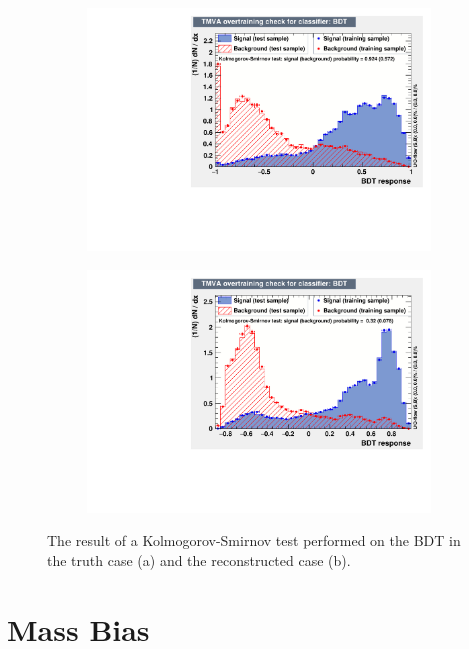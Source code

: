 \documentclass[10pt,a4paper]{book}
\begin{document}
\begin{figure}[h]
\begin{subfigure}{1.0\textwidth}
\centering
\includegraphics[scale=0.7]{ch4_images/BDT_overtraining_truth}
\caption{}
\end{subfigure}
\begin{subfigure}{1.0\textwidth}
\centering
\includegraphics[scale=0.7]{ch4_images/BDT_overtraining_reco}
\caption{}
\end{subfigure}
\caption{The result of a Kolmogorov-Smirnov test performed on the BDT in the truth case (a) and the reconstructed case (b).}
\label{kolmogorov smirnov bdt}
\end{figure} 


\section{Mass Bias}
\end{document}

